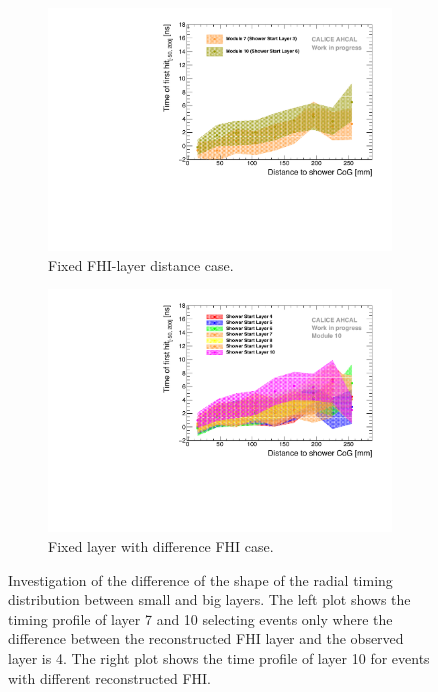 \begin{figure}[htbp!]
	\begin{subfigure}[t]{0.5\textwidth}
		\centering
		\includegraphics[width=1\textwidth]{chap5/fig_AHCAL_timing/Pions/Timing_Radius_Comparison_ShortAsymRange_ShowerStart.pdf}
		\caption{Fixed FHI-layer distance case.}\label{fig:Radius_FHI}
	\end{subfigure}
	\hfill
	\begin{subfigure}[t]{0.5\textwidth}
		\centering
		\includegraphics[width=1\textwidth]{chap5/fig_AHCAL_timing/Pions/Timing_Radius_Comparison_ShortAsymRange_ShowerStart_FixedModule.pdf}
		\caption{Fixed layer with difference FHI case.}\label{fig:Radius_FHI_Fixed}
	\end{subfigure}
	\caption{Investigation of the difference of the shape of the radial timing distribution between small and big layers. The left plot shows the timing profile of layer 7 and 10 selecting events only where the difference between the reconstructed FHI layer and the observed layer is 4. The right plot shows the time profile of layer 10 for events with different reconstructed FHI.}
	\label{fig:Radius_FHI}
\end{figure}

